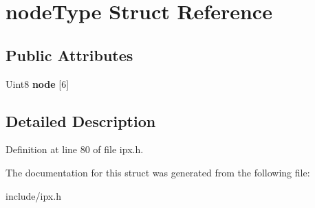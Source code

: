\hypertarget{structnodeType}{\section{node\-Type Struct Reference}
\label{structnodeType}
}
\subsection*{Public Attributes}
\begin{DoxyCompactItemize}
\item 
\hypertarget{structnodeType_a7649f1152803d93e5029064e074fc0ca}{Uint8 {\bfseries node} \mbox{[}6\mbox{]}}\label{structnodeType_a7649f1152803d93e5029064e074fc0ca}

\end{DoxyCompactItemize}


\subsection{Detailed Description}


Definition at line 80 of file ipx.\-h.



The documentation for this struct was generated from the following file\-:\begin{DoxyCompactItemize}
\item 
include/ipx.\-h\end{DoxyCompactItemize}
